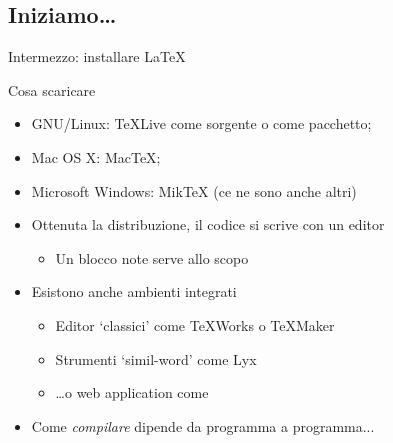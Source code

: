 \documentclass{beamer}
\begin{document}
\subsection{Iniziamo\ldots}
\begin{frame}[fragile]{\insertsubsection}
\end{frame}


\begin{frame}{Intermezzo: installare \LaTeX{}}

\begin{block}{Cosa scaricare}

\begin{itemize}
\item GNU/Linux: \TeX{}Live come sorgente o come pacchetto;
\item Mac OS X: Mac\TeX{};
\item Microsoft Windows: Mik\TeX{} (ce ne sono anche altri)
\end{itemize}
\end{block}

\begin{itemize}
\item Ottenuta la distribuzione, il codice si scrive con un editor
	\begin{itemize}
	\item Un  blocco note serve allo scopo
	\end{itemize}
\item Esistono anche ambienti integrati
	\begin{itemize}
	\item Editor `classici' come \TeX{}Works o \TeX{}Maker
	\item Strumenti `simil-word' come Lyx
	\item \ldots o web application come \wllogo
	\end{itemize}
\item Come \emph{compilare} dipende da programma a programma...
\end{itemize}

\end{frame}
\end{document}
